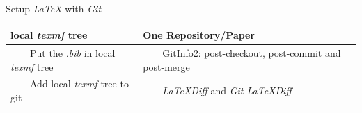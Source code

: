\documentclass[
 size=12pt,
 paper=smartboard, %
 mode=present, %
 display=slides, %
style=tuliplab,
pauseslide,
fleqn,leqno]{powerdot}
\newcommand{\tabitem}{~~\llap{\textbullet}~~}
\begin{document}
\begin{slide}{Setup \textit{\LaTeX} with \textit{Git}}
	
	\begin{center}
		\begin{table}
			\centering
			\begin{tabular}{ll}
				\toprule
				\textbf{local \textit{texmf} tree} & \textbf{One Repository/Paper} \\
				\midrule
				\tabitem Put the \textit{.bib} in local \textit{texmf} tree & \tabitem GitInfo2: post-checkout, 
				post-commit and post-merge\\
				\tabitem Add local \textit{texmf} tree to git & \tabitem \textit{LaTeXDiff} and 
				\textit{Git-LaTeXDiff} \\[.5\normalbaselineskip]
				\bottomrule
			\end{tabular}
		\end{table}
	\end{center}
	

\end{slide}
\end{document}
